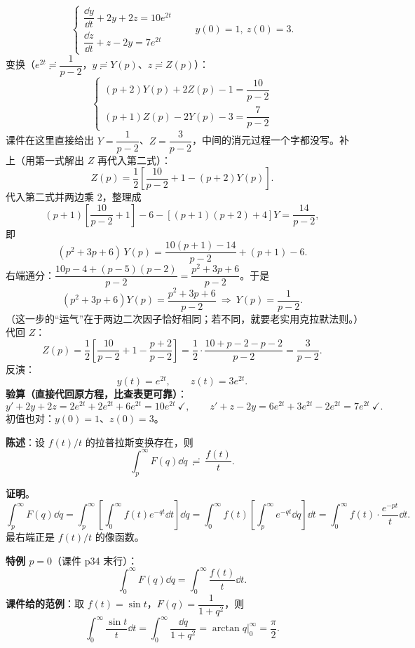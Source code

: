 \documentclass[11pt]{ctexart}
\begin{document}
\[
\begin{cases}
\dfrac{\dd y}{\dd t}+2y+2z=10e^{2t}\\[4pt]
\dfrac{\dd z}{\dd t}+z-2y=7e^{2t}
\end{cases}
\qquad y(0)=1,\ z(0)=3 .
\]
变换（$e^{2t}\risingdotseq\dfrac{1}{p-2}$，$y\risingdotseq Y(p)$、$z\risingdotseq Z(p)$）：
\[
\begin{cases}
(p+2)Y(p)+2Z(p)-1=\dfrac{10}{p-2}\\[6pt]
(p+1)Z(p)-2Y(p)-3=\dfrac{7}{p-2}
\end{cases}
\]
课件在这里直接给出 $Y=\dfrac{1}{p-2}$、$Z=\dfrac{3}{p-2}$，中间的消元过程一个字都没写。补上（用第一式解出 $Z$ 再代入第二式）：
\[
Z(p)=\frac{1}{2}\left[\frac{10}{p-2}+1-(p+2)Y(p)\right] .
\]
代入第二式并两边乘 $2$，整理成
\[
(p+1)\left[\frac{10}{p-2}+1\right]-6-\left[(p+1)(p+2)+4\right]Y=\frac{14}{p-2} ,
\]
即
\[
(p^{2}+3p+6)\,Y(p)=\frac{10(p+1)-14}{p-2}+(p+1)-6 .\]
右端通分：$\dfrac{10p-4+(p-5)(p-2)}{p-2}=\dfrac{p^{2}+3p+6}{p-2}$。于是
\[
(p^{2}+3p+6)Y(p)=\frac{p^{2}+3p+6}{p-2}\ \Longrightarrow\ Y(p)=\frac{1}{p-2} .
\]
（这一步的“运气”在于两边二次因子恰好相同；若不同，就要老实用克拉默法则。）代回 $Z$：
\[ Z(p)=\frac{1}{2}\left[\frac{10}{p-2}+1-\frac{p+2}{p-2}\right]=\frac{1}{2}\cdot\frac{10+p-2-p-2}{p-2}=\frac{3}{p-2} .\]
反演：
\[ y(t)=e^{2t},\qquad z(t)=3e^{2t} .\]
\textbf{验算（直接代回原方程，比查表更可靠）}：
\[ y'+2y+2z=2e^{2t}+2e^{2t}+6e^{2t}=10e^{2t}\ \checkmark,\qquad
z'+z-2y=6e^{2t}+3e^{2t}-2e^{2t}=7e^{2t}\ \checkmark .\]
初值也对：$y(0)=1$、$z(0)=3$。


\textbf{陈述}：设 $f(t)/t$ 的拉普拉斯变换存在，则
\[ \int_{p}^{\infty}F(q)\dd q\ \risingdotseq\ \frac{f(t)}{t} .\]

\textbf{证明}。
\[
\int_{p}^{\infty}F(q)\dd q
=\int_{p}^{\infty}\!\!\left[\int_0^{\infty}f(t)e^{-qt}\dd t\right]\dd q
=\int_0^{\infty}\! f(t)\left[\int_{p}^{\infty}e^{-qt}\dd q\right]\dd t
=\int_0^{\infty}\! f(t)\cdot\frac{e^{-pt}}{t}\dd t .
\]
最右端正是 $f(t)/t$ 的像函数。

\textbf{特例 $p=0$}（课件 p34 末行）：
\[ \int_0^{\infty}F(q)\dd q=\int_0^{\infty}\frac{f(t)}{t}\dd t .\]
\textbf{课件给的范例}：取 $f(t)=\sin t$，$F(q)=\dfrac{1}{1+q^{2}}$，则
\[ \int_0^{\infty}\frac{\sin t}{t}\dd t=\int_0^{\infty}\frac{\dd q}{1+q^{2}}=\arctan q\Big|_0^{\infty}=\frac{\pi}{2} .\]

\end{document}
